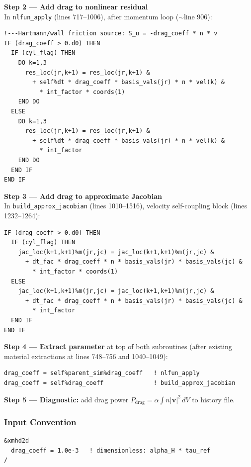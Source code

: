 \documentclass[11pt,letterpaper]{article}
\begin{document}
\textbf{Step 2 --- Add drag to nonlinear residual} \\
In \texttt{nlfun\_apply} (lines 717--1006), after momentum loop ($\sim$line 906):

\begin{lstlisting}[caption={Drag source term in nlfun\_apply after line~$\sim$906}]
!---Hartmann/wall friction source: S_u = -drag_coeff * n * v
IF (drag_coeff > 0.d0) THEN
  IF (cyl_flag) THEN
    DO k=1,3
      res_loc(jr,k+1) = res_loc(jr,k+1) &
        + self%dt * drag_coeff * basis_vals(jr) * n * vel(k) &
          * int_factor * coords(1)
    END DO
  ELSE
    DO k=1,3
      res_loc(jr,k+1) = res_loc(jr,k+1) &
        + self%dt * drag_coeff * basis_vals(jr) * n * vel(k) &
          * int_factor
    END DO
  END IF
END IF
\end{lstlisting}

\textbf{Step 3 --- Add drag to approximate Jacobian} \\
In \texttt{build\_approx\_jacobian} (lines 1010--1516), velocity self-coupling block
(lines 1232--1264):

\begin{lstlisting}[caption={Drag diagonal Jacobian in momentum block}]
IF (drag_coeff > 0.d0) THEN
  IF (cyl_flag) THEN
    jac_loc(k+1,k+1)%m(jr,jc) = jac_loc(k+1,k+1)%m(jr,jc) &
      + dt_fac * drag_coeff * n * basis_vals(jr) * basis_vals(jc) &
        * int_factor * coords(1)
  ELSE
    jac_loc(k+1,k+1)%m(jr,jc) = jac_loc(k+1,k+1)%m(jr,jc) &
      + dt_fac * drag_coeff * n * basis_vals(jr) * basis_vals(jc) &
        * int_factor
  END IF
END IF
\end{lstlisting}

\textbf{Step 4 --- Extract parameter} at top of both subroutines (after existing
material extractions at lines 748--756 and 1040--1049):
\begin{lstlisting}
drag_coeff = self%parent_sim%drag_coeff   ! nlfun_apply
drag_coeff = self%drag_coeff              ! build_approx_jacobian
\end{lstlisting}

\textbf{Step 5 --- Diagnostic:} add drag power
$P_\mathrm{drag} = \alpha \int n|\mathbf{v}|^2\,dV$ to history file.

\subsubsection{Input Convention}
\begin{verbatim}
&xmhd2d
  drag_coeff = 1.0e-3   ! dimensionless: alpha_H * tau_ref
/
\end{verbatim}
\end{document}
